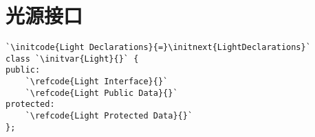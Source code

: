 \section{光源接口}\label{sec:光源接口}

\begin{lstlisting}
`\initcode{Light Declarations}{=}\initnext{LightDeclarations}`
class `\initvar{Light}{}` {
public:
    `\refcode{Light Interface}{}`
    `\refcode{Light Public Data}{}`
protected:
    `\refcode{Light Protected Data}{}`
};
\end{lstlisting}